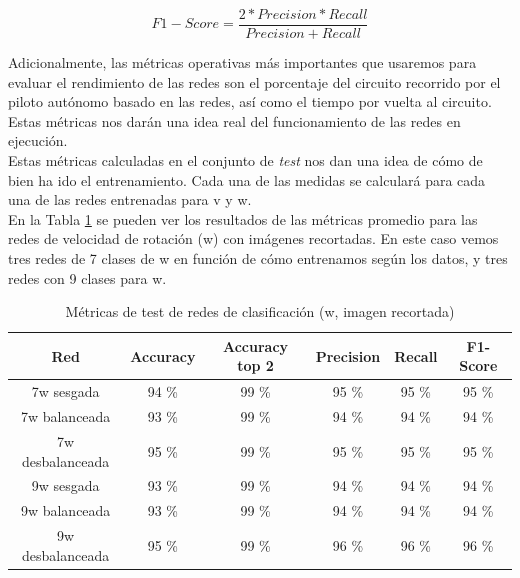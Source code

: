 \[F1-Score =  \frac{2 * Precision * Recall}{Precision + Recall} \]
\vspace{10pt}

Adicionalmente, las métricas operativas más importantes que usaremos para evaluar el rendimiento de las redes son el porcentaje del circuito recorrido por el piloto autónomo basado en las redes, así como el tiempo por vuelta al circuito. Estas métricas nos darán una idea real del funcionamiento de las redes en ejecución.\\

Estas métricas calculadas en el conjunto de \textit{test} nos dan una idea de cómo de bien ha ido el entrenamiento. Cada una de las medidas se calculará para cada una de las redes entrenadas para v y w.\\

En la Tabla \ref{metricas_classificacion_recortada_w} se pueden ver los resultados de las métricas promedio para las redes de velocidad de rotación (w) con imágenes recortadas. En este caso vemos tres redes de 7 clases de w en función de cómo entrenamos según los datos, y tres redes con 9 clases para w.\\


\begin{table}[H]
\centering
\caption{Métricas de test de redes de clasificación (w, imagen recortada)}
\label{metricas_classificacion_recortada_w}
\begin{tabular}{c|c|c|c|c|c|}
\cline{1-6}
                        \multicolumn{1}{|c|}{Red}    & Accuracy       & Accuracy top 2      & Precision       & Recall        & F1-Score        \\ \hline
\multicolumn{1}{|c|}{7w sesgada}    & 94 \%             & 99 \%         & 95 \%            & 95 \%          & 95 \%       \\ \hline
\multicolumn{1}{|c|}{7w balanceada}     & 93 \%             & 99 \%          &  94 \%              &  94 \%            &  94 \%             \\ \hline
\multicolumn{1}{|c|}{7w desbalanceada}      &  95 \%             & 99 \%           &  95 \%            & 95 \%        &  95 \%            \\ \hline
\multicolumn{1}{|c|}{9w sesgada}       &  93 \%     &  99 \%      &  94 \%           &  94 \%            &  94 \%               \\ \hline
\multicolumn{1}{|c|}{9w balanceada}      &  93 \%         &  99 \%        &  94 \%         &  94 \%      &  94 \%          \\ \hline
\multicolumn{1}{|c|}{9w desbalanceada}     & 95 \%          & 99 \%        & 96 \%           & 96 \%         & 96 \%                \\ \hline
\end{tabular}
\end{table}

